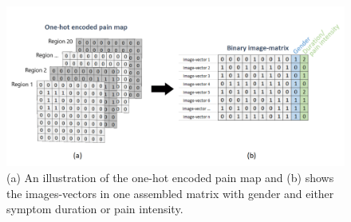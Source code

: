 \begin{figure} [H]
\centering
\includegraphics[width=1\textwidth]{figures/onehotmatrix}
\caption{(a) An illustration of the one-hot encoded pain map and (b) shows the images-vectors in one assembled matrix with gender and either symptom duration or pain intensity.}
\label{fig:onehot}
\end{figure}